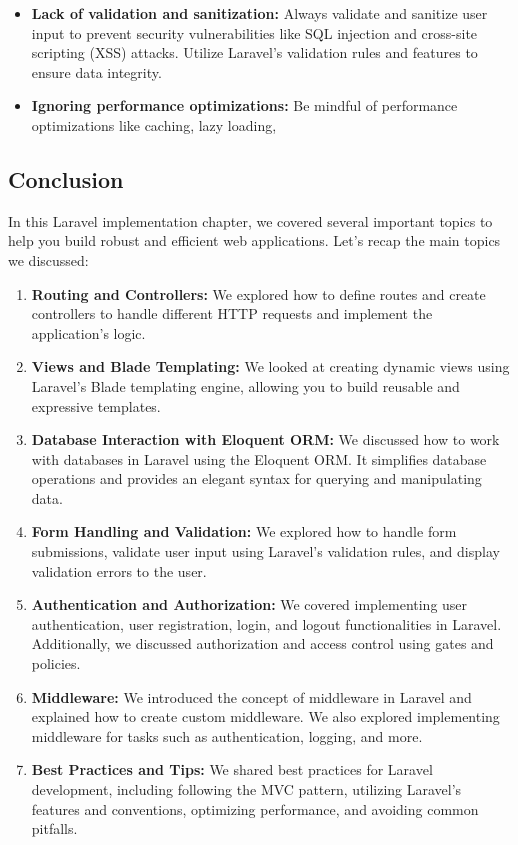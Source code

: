 \begin{itemize}
\begin{itemize}
    \item \textbf{Lack of validation and sanitization:} Always validate and sanitize user input to prevent security vulnerabilities like SQL injection and cross-site scripting (XSS) attacks. Utilize Laravel's validation rules and features to ensure data integrity.
    
    \item \textbf{Ignoring performance optimizations:} Be mindful of performance optimizations like caching, lazy loading,
\end{itemize}
\end{itemize}
\newpage
\subsection{Conclusion}
In this Laravel implementation chapter, we covered several important topics to help you build robust and efficient web applications. Let's recap the main topics we discussed:
\begin{enumerate}
\item \textbf{Routing and Controllers:} We explored how to define routes and create controllers to handle different HTTP requests and implement the application's logic.

\item \textbf{Views and Blade Templating:} We looked at creating dynamic views using Laravel's Blade templating engine, allowing you to build reusable and expressive templates.

\item \textbf{Database Interaction with Eloquent ORM:} We discussed how to work with databases in Laravel using the Eloquent ORM. It simplifies database operations and provides an elegant syntax for querying and manipulating data.

\item \textbf{Form Handling and Validation:} We explored how to handle form submissions, validate user input using Laravel's validation rules, and display validation errors to the user.

\item \textbf{Authentication and Authorization:} We covered implementing user authentication, user registration, login, and logout functionalities in Laravel. Additionally, we discussed authorization and access control using gates and policies.

\item \textbf{Middleware:} We introduced the concept of middleware in Laravel and explained how to create custom middleware. We also explored implementing middleware for tasks such as authentication, logging, and more.

\item \textbf{Best Practices and Tips:} We shared best practices for Laravel development, including following the MVC pattern, utilizing Laravel's features and conventions, optimizing performance, and avoiding common pitfalls.
\end{enumerate}
